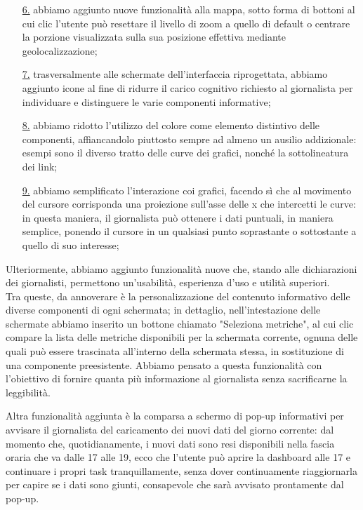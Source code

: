 \documentclass[../../main.tex]{subfiles}
\begin{document}
\begin{enumerate}
    \item [{\hyperref[el:6]{6.}}] abbiamo aggiunto nuove funzionalità alla mappa, sotto forma di bottoni al cui clic l'utente può resettare il livello di zoom a quello di default o centrare la porzione visualizzata sulla sua posizione effettiva mediante geolocalizzazione; 
    \item [{\hyperref[el:7]{7.}}] trasversalmente alle schermate dell'interfaccia riprogettata, abbiamo aggiunto icone al fine di ridurre il carico cognitivo richiesto al giornalista per individuare e distinguere le varie componenti informative;
    \item [{\hyperref[el:8]{8.}}] abbiamo ridotto l'utilizzo del colore come elemento distintivo delle componenti, affiancandolo piuttosto sempre ad almeno un ausilio addizionale: esempi sono il diverso tratto delle curve dei grafici, nonché la sottolineatura dei link;
    \item [{\hyperref[el:9]{9.}}] abbiamo semplificato l'interazione coi grafici, facendo sì che al movimento del cursore corrisponda una proiezione sull'asse delle x che intercetti le curve: in questa maniera, il giornalista può ottenere i dati puntuali, in maniera semplice, ponendo il cursore in un qualsiasi punto soprastante o sottostante a quello di suo interesse; 
\end{enumerate}
	
Ulteriormente, abbiamo aggiunto funzionalità nuove che, stando alle dichiarazioni dei giornalisti, permettono un'usabilità, esperienza d'uso e utilità superiori.\\
Tra queste, da annoverare è la personalizzazione del contenuto informativo delle diverse componenti di ogni schermata; in dettaglio, nell'intestazione delle schermate abbiamo inserito un bottone chiamato "Seleziona metriche", al cui clic compare la lista delle metriche disponibili per la schermata corrente, ognuna delle quali può essere trascinata all'interno della schermata stessa, in sostituzione di una componente preesistente. Abbiamo pensato a questa funzionalità con l'obiettivo di fornire quanta più informazione al giornalista senza sacrificarne la leggibilità.

Altra funzionalità aggiunta è la comparsa a schermo di pop-up informativi per avvisare il giornalista del caricamento dei nuovi dati del giorno corrente: dal momento che, quotidianamente, i nuovi dati sono resi disponibili nella fascia oraria che va dalle 17 alle 19, ecco che l'utente può aprire la dashboard alle 17 e continuare i propri task tranquillamente, senza dover continuamente riaggiornarla per capire se i dati sono giunti, consapevole che sarà avvisato prontamente dal pop-up.
\end{document}
